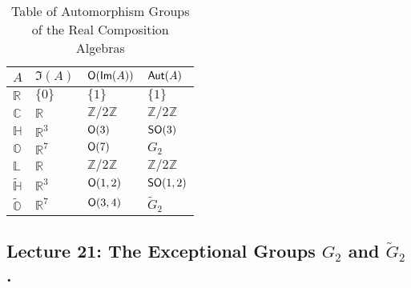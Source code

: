 \begin{table}[h]
\centering
\begin{tabular}{llll}
$A$                  & $\Im(A)$       & $\operatorname{\textsf{O}}(\textsf{Im}(A))$          & $\operatorname{\textsf{Aut}}(A)$                \\ \hline
$\mathbb{R}$         & $\{0\}$        & $\{1\}$                  & $\{1\}$                  \\
$\mathbb{C}$         & $\mathbb{R}$   & $\mathbb{Z}/2\mathbb{Z}$ & $\mathbb{Z}/2\mathbb{Z}$ \\
$\mathbb{H}$         & $\mathbb{R}^3$ & $\operatorname{\textsf{O}}(3)$               & $\operatorname{\textsf{SO}}(3)$                 \\
$\mathbb{O}$         & $\mathbb{R}^7$ & $\operatorname{\textsf{O}}(7)$               & $G_2$                    \\
$\mathbb{L}$         & $\mathbb{R}$   & $\mathbb{Z}/2\mathbb{Z}$ & $\mathbb{Z}/2\mathbb{Z}$ \\
$\tilde{\mathbb{H}}$ & $\mathbb{R}^3$ & $\operatorname{\textsf{O}}(1,2)$             & $\operatorname{\textsf{SO}}(1,2)$               \\
$\tilde{\mathbb{O}}$ & $\mathbb{R}^7$ & $\operatorname{\textsf{O}}(3,4)$             & $\tilde{G}_2$           
\end{tabular}
\caption{Table of Automorphism Groups of the Real Composition Algebras}
\end{table}

\subsection{Lecture 21: The Exceptional Groups $G_2$ and $\tilde{G}_2$.}
